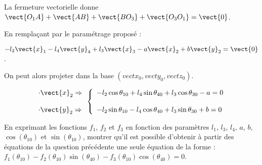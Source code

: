 \documentclass[11pt]{article}
\begin{document}
\begin{UPSTIcorrige}

La fermeture vectorielle donne $\vect{O_1A}+\vect{AB}+\vect{BO_3}+\vect{O_3O_1}=\vect{0}$.

En remplaçant par le paramétrage proposé : 

$-l_2\vect{x}_1-l_4\vect{y}_4+l_3\vect{x}_3-a\vect{x}_2+b\vect{y}_2=\vect{0}$.

On peut alors projeter dans la base $\left(vect{x}_0,vect{y}_0,vect{z}_0\right)$.

\begin{align*}
\begin{array}{l}
\cdot \vect{x}_2 \Rightarrow\\
\\
\cdot \vect{y}_2 \Rightarrow\\
\end{array}
\left\{
\begin{array}{l}
-l_2\cos\theta_{10}+l_4\sin\theta_{40}+l_3\cos\theta_{30}-a=0\\
\\
-l_2\sin\theta_{10}-l_4\cos\theta_{40}+l_3\sin\theta_{30}+b=0
\end{array}
\right.
\end{align*}



\end{UPSTIcorrige}

\UPSTIquestion En exprimant les fonctions $f_1$, $f_2$ et $f_3$ en fonction des paramètres $l_1$, $l_3$, $l_4$, $a$, $b$, $\cos(\theta_{10})$ et $\sin(\theta_{10})$, montrer qu'il est possible d'obtenir à partir des équations de la question précédente une seule équation de la forme : $f_1(\theta_{10})-f_2(\theta_{10})\sin(\theta_{40}) - f_3(\theta_{10}) \cos(\theta_{40}) = 0$.
\end{document}
